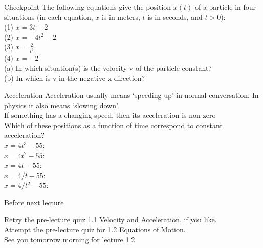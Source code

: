  
  \begin{frame}{Checkpoint }
  \small
The following equations give the position $x(t)$ of a particle in four situations (in each equation, $x$ is in meters, $t$ is in seconds, and $t > 0$):\\[2ex]

 (1) $x = 3t - 2$\\[1ex]
 (2) $x = -4t^2 - 2$\\[1ex]
 (3) $x = \frac{2}{t^2}$\\[1ex]
 (4) $x = -2$ \\[3ex]
 
 (a) In which situation(s) is the velocity v of the particle constant? \\[2ex]
 (b) In which is v in the negative x direction?\\
\vspace{2cm}
 
 
 \end{frame}
 
\begin{frame}{Acceleration}
\small
Acceleration usually means `speeding up' in normal conversation. In physics it also means `slowing down'.\\[1ex]

If something has a changing speed, then its acceleration is non-zero\\[1ex]

Which of these positions as a function of time correspond to constant acceleration?\\[1ex]
$x = 4t^3 - 55$:\\[1ex]
$x = 4t^2 - 55$:\\[1ex]
$x = 4t - 55$:\\[1ex]
$x = 4/t - 55$:\\[1ex]
$x = 4/t^2 - 55$:\\[1ex]
\end{frame}


\begin{frame}{Before next lecture}

Retry the pre-lecture quiz 1.1  Velocity and Acceleration, if you like.\\[2ex]
Attempt the pre-lecture quiz for 1.2  Equations of Motion.\\[2ex]
See you tomorrow morning for lecture 1.2\\

\end{frame}



 
